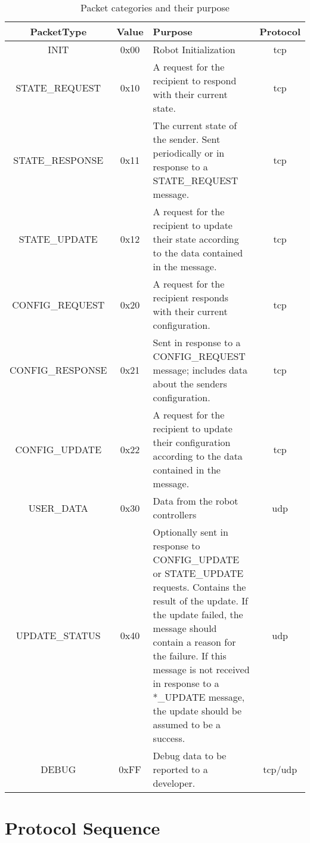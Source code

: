 \documentclass[11pt]{article}
\begin{document}
\begin{table}[h!]
    \centering
    \caption{Packet categories and their purpose}
    \label{tab:pktTypes}
    \begin{tabular}{|c|c|p{3in}|c|}
        \hline
        PacketType & Value & Purpose & Protocol \\ 
        \hline
        INIT & 0x00 & Robot Initialization & \acrshort{tcp} \\ 
        \hline
        STATE\_REQUEST & 0x10 & A request for the recipient to respond with their current state. & \acrshort{tcp} \\
        \hline
        STATE\_RESPONSE & 0x11 & The current state of the sender. Sent periodically or in response to a STATE\_REQUEST message. & \acrshort{tcp} \\
        \hline
        STATE\_UPDATE & 0x12 & A request for the recipient to update their state according to the data contained in the message. & \acrshort{tcp} \\
        \hline
        CONFIG\_REQUEST & 0x20 & A request for the recipient responds with their current configuration. & \acrshort{tcp} \\
        \hline
        CONFIG\_RESPONSE & 0x21 & Sent in response to a CONFIG\_REQUEST message; 
            includes data about the senders configuration. & \acrshort{tcp} \\
        \hline
        CONFIG\_UPDATE & 0x22 & A request for the recipient to update their configuration according to the data contained 
            in the message. & \acrshort{tcp} \\
        \hline
        USER\_DATA & 0x30 & Data from the robot controllers & \acrshort{udp} \\
        \hline
        UPDATE\_STATUS & 0x40 & Optionally sent in response to CONFIG\_UPDATE or STATE\_UPDATE requests.
        Contains the result of the update.  If the update failed, the message should contain a reason for the failure.
        If this message is not received in response to a *\_UPDATE message, the update should be assumed to be a success.
        & \acrshort{udp} \\
        \hline
        DEBUG & 0xFF & Debug data to be reported to a developer. & \acrshort{tcp}/\acrshort{udp} \\
        \hline
    \end{tabular}
\end{table}

\section {Protocol Sequence}
\end{document}
